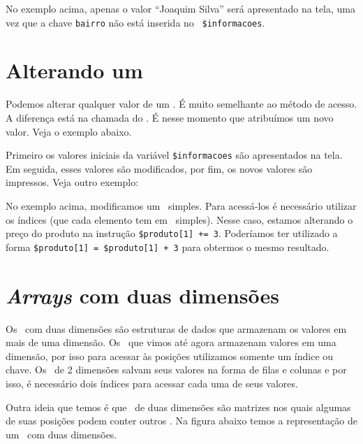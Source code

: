 

No exemplo acima, apenas o valor ``Joaquim Silva'' será apresentado na tela, uma vez que
a chave \texttt{bairro} não está inserida no \tipoarray~\texttt{\$informacoes}.

\section{Alterando um \tipoarray}
\label{alterando-um-array}

Podemos alterar qualquer valor de um \tipoarray. É muito semelhante ao método de acesso. 
A diferença está na chamada do \tipoarray. É nesse momento que atribuímos um novo valor.
Veja o exemplo abaixo.



Primeiro os valores iniciais da variável \texttt{\$informacoes} são apresentados na tela.
Em seguida, esses valores são modificados, por fim, os novos valores são impressos.
Veja outro exemplo:



No exemplo acima, modificamos um \tipoarray~simples. Para acessá-los é necessário utilizar
os índices (que cada elemento tem em \tipoarrays~simples). Nesse caso, estamos alterando
o preço do produto na instrução \texttt{\$produto[1] += 3}. Poderíamos ter utilizado a forma
\texttt{\$produto[1] = \$produto[1] + 3} para obtermos o mesmo resultado.

\section{\textit{Arrays} com duas dimensões}
\label{arrays-com-duas-dimensoes}

Os \tipoarrays~com duas dimensões são estruturas de dados que armazenam os valores em 
mais de uma dimensão. Os \tipoarrays~que vimos até agora armazenam valores em uma dimensão, 
por isso para acessar às posições utilizamos somente um índice ou chave. Os \tipoarrays~de 
2 dimensões salvam seus valores na forma de filas e colunas e por isso, é 
necessário dois índices para acessar cada uma de seus valores.

Outra ideia que temos é que \tipoarrays~de duas dimensões são matrizes nos quais 
algumas de suas posições podem conter outros \tipoarrays. Na figura abaixo temos a 
representação de um \tipoarray~com duas dimensões.

